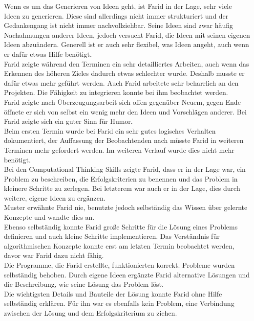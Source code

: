 Wenn es um das Generieren von Ideen geht, ist Farid in der Lage, sehr viele Ideen zu generieren. Diese sind allerdings nicht immer strukturiert und der Gedankengang ist nicht immer nachvollziehbar. Seine Ideen sind zwar häufig Nachahmungen anderer Ideen, jedoch versucht Farid, die Ideen mit seinen eigenen Ideen abzuändern. Generell ist er auch sehr flexibel, was Ideen angeht, auch wenn er dafür etwas Hilfe benötigt.\\
Farid zeigte während den Terminen ein sehr detailliertes Arbeiten, auch wenn das Erkennen des höheren Zieles dadurch etwas schlechter wurde. Deshalb musste er dafür etwas mehr geführt werden. Auch Farid arbeitete sehr beharrlich an den Projekten. Die Fähigkeit zu integrieren konnte bei ihm beobachtet werden.\\
Farid zeigte nach Überzeugungsarbeit sich offen gegenüber Neuem, gegen Ende öffnete er sich von selbst ein wenig mehr den Ideen und Vorschlägen anderer. Bei Farid zeigte sich ein guter Sinn für Humor. \\
Beim ersten Termin wurde bei Farid ein sehr gutes logisches Verhalten dokumentiert, der Auffassung der Beobachtenden nach müsste Farid in weiteren Terminen mehr gefordert werden. Im weiteren Verlauf wurde dies nicht mehr benötigt.\\

Bei den Computational Thinking Skills zeigte Farid, dass er in der Lage war, ein Problem zu beschreiben, die Erfolgskriterien zu benennen und das Problem in kleinere Schritte zu zerlegen. Bei letzterem war auch er in der Lage, dies durch weitere, eigene Ideen zu ergänzen.\\
Muster erwähnte Farid nie, benutzte jedoch selbständig das Wissen über gelernte Konzepte und wandte dies an.\\
Ebenso selbständig konnte Farid große Schritte für die Lösung eines Problems definieren und auch kleine Schritte implementieren. Das Verständnis für algorithmischen Konzepte konnte erst am letzten Termin beobachtet werden, davor war Farid dazu nicht fähig.\\
Die Programme, die Farid erstellte, funktionierten korrekt. Probleme wurden selbständig behoben. Durch eigene Ideen ergänzte Farid alternative Lösungen und die Beschreibung, wie seine Lösung das Problem löst.\\
Die wichtigsten Details und Bauteile der Lösung konnte Farid ohne Hilfe selbständig erklären. Für ihn war es ebenfalls kein Problem, eine Verbindung zwischen der Lösung und dem Erfolgskriterium zu ziehen. 

